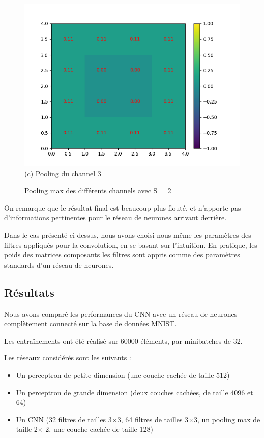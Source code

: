 \begin{figure}[h]
        \includegraphics[width=\textwidth]{img/cnn_exemple/square/stride_3_max.png}
        \center 
        (c) Pooling du channel 3
    \endminipage
    \caption{Pooling max des différents channels avec S = 2} 
\end{figure}



On remarque que le résultat final est beaucoup plus flouté, et n'apporte pas d'informations pertinentes pour le réseau de 
neurones arrivant derrière.


Dans le cas présenté ci-dessus, nous avons choisi nous-même les paramètres des filtres appliqués pour la convolution,
en se basant sur l'intuition.
En pratique, les poids des matrices composants les filtres sont appris comme des paramètres standards d'un réseau de neurones.

\newpage

\subsection{Résultats}

Nous avons comparé les performances du CNN avec un réseau de neurones complètement connecté sur la base de données MNIST.

Les entraînements ont été réalisé sur 60000 éléments, par minibatches de 32.

Les réseaux considérés sont les suivants : 
\begin{itemize}
    \item Un perceptron de petite dimension (une couche cachée de taille 512)
    \item Un perceptron de grande dimension (deux couches cachées, de taille 4096 et 64)
    \item Un CNN (32 filtres de tailles 3$\times$3, 64 filtres de tailles 3$\times$3, un pooling max de taille 2$\times$ 2, une couche cachée de taille 128)
\end{itemize}

